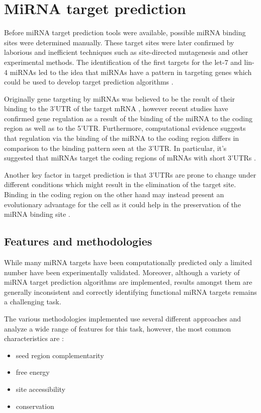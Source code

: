 \section{MiRNA target prediction}
Before miRNA target prediction tools were available, possible miRNA binding sites were
determined manually. These target sites were later confirmed by laborious and inefficient techniques such as site-directed mutagenesis and other experimental methods. The identification of the first targets for the let-7 and lin-4 miRNAs led to the idea that miRNAs have a pattern in targeting genes which could be used to develop target prediction algorithms \cite{first_predictions}.

Originally gene targeting by miRNAs was believed to be the result of their binding to the 3'UTR of the target mRNA \cite{multiple_binds}, however recent studies \cite{grosswendt} have confirmed gene regulation as a result of the binding of the miRNA to the coding region as well as to the 5'UTR. Furthermore, computational evidence suggests that regulation via the binding of the miRNA to the coding region differs in comparison to the binding pattern seen at the 3'UTR. In particular, it's suggested that miRNAs target the coding regions of mRNAs with short 3'UTRs \cite{functional_sites}.

Another key factor in target prediction is that 3'UTRs are prone to change under different conditions which might result in the elimination of the target site. Binding in the coding region on the other hand may instead present an evolutionary advantage for the cell as it could help in the preservation of the miRNA binding site \cite{mirna_targets}. 

\subsection{Features and methodologies}
While many miRNA targets have been computationally predicted only a limited number
have been experimentally validated. Moreover, although a variety of miRNA target prediction algorithms are implemented, results amongst them are generally inconsistent and correctly identifying functional miRNA targets remains a challenging task.

The various methodologies implemented use several different approaches and analyze a wide range of features for this task, however, the most common characteristics are \cite{common_features}:
\begin{itemize}
	\item seed region complementarity
	\item free energy
	\item site accessibility
	\item conservation
\end{itemize}

